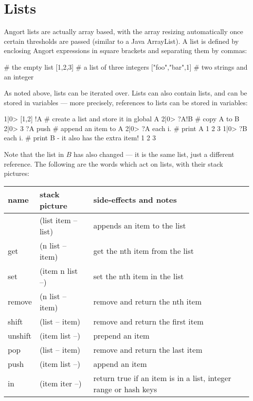 \section{Lists}
Angort lists are actually array based, with the array resizing automatically
once certain thresholds are passed (similar to a Java ArrayList).
A list is defined by enclosing Angort expressions in square
brackets and separating them by commas:
\begin{v}
[]              # the empty list
[1,2,3]         # a list of three integers
["foo","bar",1] # two strings and an integer
\end{v}
As noted above, lists can be iterated over. Lists can also contain lists,
and can be stored in variables ---  more precisely, references to lists can
be stored in variables:
\begin{v}
1|0> [1,2] !A       # create a list and store it in global A
2|0> ?A!B           # copy A to B
2|0> 3 ?A push      # append an item to A
2|0> ?A each {i.}   # print A
1
2
3
1|0> ?B each {i.}   # print B - it also has the extra item!
1
2
3
\end{v}
Note that the list in $B$ has also changed --- it is the same list,
just a different reference.
The following are the words which act on lists, with their stack pictures:
\begin{center}
\begin{tabular}{|l|l|p{4in}|}\hline
\textbf{name} & \textbf{stack picture} & \textbf{side-effects and notes}\\ \hline
[    & (-- list)    & creates a new list\\
,    & (list item -- list) & appends an item to the list\\
]    & (list item -- list) & appends an item to the list\\
get & (n list -- item) & get the nth item from the list\\
set & (item n list --) & set the nth item in the list\\
remove & (n list -- item) & remove and return the nth item\\
shift & (list -- item) & remove and return the first item\\
unshift & (item list --) & prepend an item\\
pop & (list -- item) & remove and return the last item\\
push & (item list --) & append an item\\
in & (item iter --) & return true if an item is in a list, integer range or hash keys\\
\hline
\end{tabular}
\end{center}
